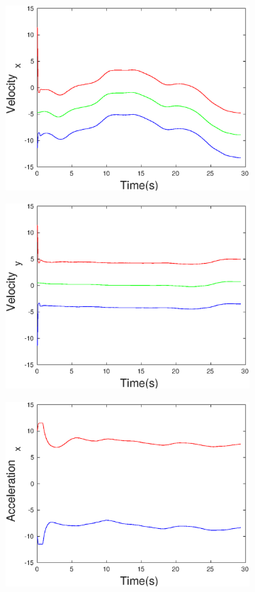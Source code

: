 \begin{figure}[h]
\begin{subfigure}{.5\linewidth}
\includegraphics[width=.9\linewidth]{figures/Frad/s3pmSMVelocity_x}
\end{subfigure}
\begin{subfigure}{.5\linewidth}
\centering
\includegraphics[width=.9\linewidth]{figures/Frad/s3pmSMVelocity_y}
\end{subfigure}
\begin{subfigure}{.5\linewidth}
\centering
\includegraphics[width=.9\linewidth]{figures/Frad/s3pmSMAcceleration_x}

\end{subfigure}
\end{figure}
